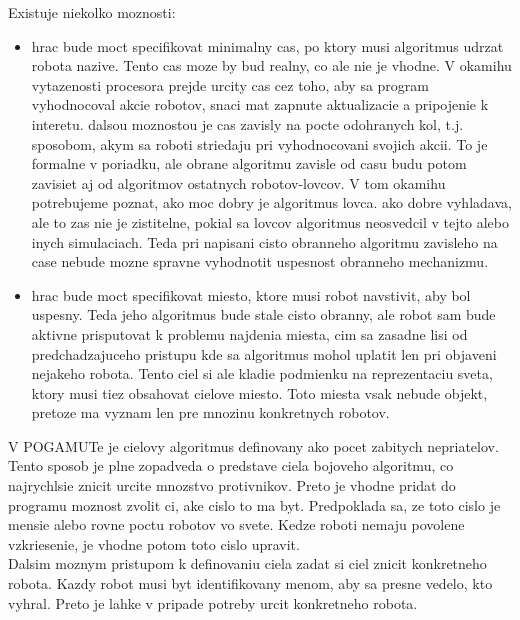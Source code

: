 \documentclass[a4paper,11pt,final]{report}
\begin{document}
Existuje niekolko moznosti:
\begin{itemize}
\item hrac bude moct specifikovat minimalny cas, po ktory musi algoritmus udrzat robota nazive. Tento cas moze by bud realny, co ale nie je vhodne. V okamihu vytazenosti procesora prejde urcity cas cez toho, aby sa program vyhodnocoval akcie robotov, snaci mat zapnute aktualizacie a pripojenie k interetu. dalsou moznostou je cas zavisly na pocte odohranych kol, t.j. sposobom, akym sa roboti striedaju pri vyhodnocovani svojich akcii. To je formalne v poriadku, ale obrane algoritmu zavisle od casu budu potom zavisiet aj od algoritmov ostatnych robotov-lovcov. V tom okamihu potrebujeme poznat, ako moc dobry je algoritmus lovca. ako dobre vyhladava, ale to zas nie je zistitelne, pokial sa lovcov algoritmus neosvedcil v tejto alebo inych simulaciach. Teda pri napisani cisto obranneho algoritmu zavisleho na case nebude mozne spravne vyhodnotit uspesnost obranneho mechanizmu. %
\item hrac bude moct specifikovat miesto, ktore musi robot navstivit, aby bol uspesny. Teda jeho algoritmus bude stale cisto obranny, ale robot sam bude aktivne prisputovat k problemu najdenia miesta, cim sa zasadne lisi od predchadzajuceho pristupu kde sa algoritmus mohol uplatit len pri objaveni nejakeho robota. Tento ciel si ale kladie podmienku na reprezentaciu sveta, ktory musi tiez obsahovat cielove miesto. Toto miesta vsak nebude objekt, pretoze ma vyznam len pre mnozinu konkretnych robotov.
\end{itemize} 
V POGAMUTe je cielovy algoritmus definovany ako pocet zabitych nepriatelov. Tento sposob je plne zopadveda o predstave ciela bojoveho algoritmu, co najrychlsie znicit urcite mnozstvo protivnikov. Preto je vhodne pridat do programu moznost zvolit ci, ake cislo to ma byt. Predpoklada sa, ze toto cislo je mensie alebo rovne poctu robotov vo svete. Kedze roboti nemaju povolene vzkriesenie, je vhodne potom toto cislo upravit.\\
Dalsim moznym pristupom k definovaniu ciela zadat si ciel znicit konkretneho robota. Kazdy robot musi byt identifikovany menom, aby sa presne vedelo, kto vyhral. Preto je lahke v pripade potreby urcit konkretneho robota.\\
\end{document}
